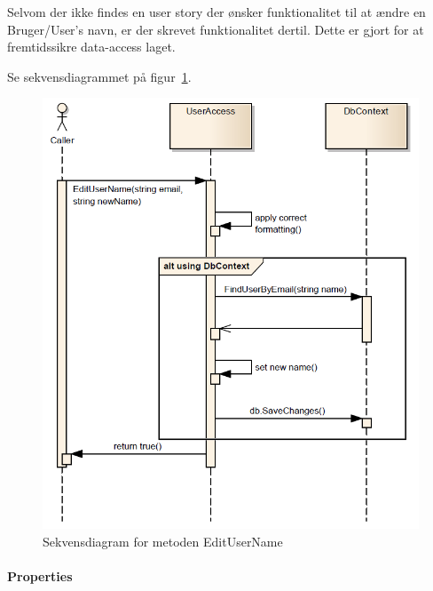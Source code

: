 Selvom der ikke findes en user story der ønsker funktionalitet til at ændre en Bruger/User's navn, er der skrevet funktionalitet dertil. Dette er gjort for at fremtidssikre data-access laget.

Se sekvensdiagrammet på figur~\ref{fig:editUserName}.

\begin{figure}[h]
\centering
\includegraphics[width=0.7\linewidth]{figs/dbSeq/editUserName.PNG}
\caption{Sekvensdiagram for metoden EditUserName}
\label{fig:editUserName}
\end{figure}


\paragraph{Properties}\